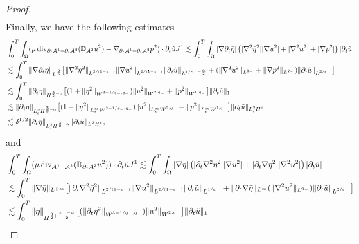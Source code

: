 \documentclass[letterpaper,reqno,10pt,twoside]{amsart}
\theoremstyle{definition}
\theoremstyle{remark}
\def\p{\partial}
\def\Om{\Omega}
\def\dive{\mathop{\rm div}\nolimits}
\begin{document}
\begin{proof}
\begin{align}
			\end{align}
			Finally, we have the following estimates
			\begin{equation}\label{est:remain_bulk23}
				\begin{aligned}
					&\int_0^T\int_\Om (\mu\dive_{\p_t\mathcal{A}^1-\p_{t}\mathcal{A}^{2}}(\mathbb{D}_{\mathcal{A}^2}{u}^{2})-\nabla_{\p_t\mathcal{A}^1-\p_{t}\mathcal{A}^{2}}{p}^{2})\cdot\p_t\tilde{u}J^1\lesssim\int_0^T\int_\Om |\nabla\p_t\bar{\eta}|\left(|\nabla^2\bar{\eta}^2||\nabla{u}^{2}|+|\nabla^2{u}^{2}|+|\nabla{p}^{2}|\right)|\p_t\tilde{u}|\\
					&\lesssim\int_0^T\|\nabla\p_t\bar{\eta}\|_{L^{\frac{2}{\alpha}}}\big[\|\nabla^2\bar{\eta}^2\|_{L^{2/(1-\varepsilon_-)}}\|\nabla{u}^{2}\|_{L^{2/(1-\varepsilon_-)}}\|\p_t\tilde{u}\|_{L^{1/\varepsilon_--\frac{\alpha}{2}}}+(\|\nabla^2{u}^{2}\|_{L^{q_-}}+\|\nabla{p}^{2}\|_{L^{q_-}})\|\p_t\tilde{u}\|_{L^{2/\varepsilon_-}}\big]\\
					&\lesssim\int_0^T\|\p_t\eta\|_{H^{\frac{3}{2}-\alpha}}\big[(1+\|\eta^2\|_{W^{3-1/q_-,q_-}})\|{u}^{2}\|_{W^{2,q_-}}+\|{p}^{2}\|_{W^{1,q_-}}\big]\|\p_t\tilde{u}\|_{1}\\
					&\lesssim \|\p_t\eta\|_{L_{t}^{2}H^{\frac{3}{2}-\alpha}}\big[(1+\|\eta^2\|_{L_{t}^{\infty}W^{3-1/q_-,q_-}})\|{u}^{2}\|_{L_{t}^{\infty}W^{2,q_-}}+\|{p}^{2}\|_{L_{t}^{\infty}W^{1,q_-}}\big]\|\p_t\tilde{u}\|_{L_{t}^{2}H^{1}}\\
					&\lesssim\delta^{1/2}\|\p_t\eta\|_{L_{t}^{2}H^{\frac{3}{2}-\alpha}}\|\p_t\tilde{u}\|_{L^2H^1},
				\end{aligned}
			\end{equation}
			and 
			\begin{equation}
				\begin{aligned}
					&\int_0^T\int_\Om (\mu\dive_{\mathcal{A}^1-\mathcal{A}^{2}}(\mathbb{D}_{\p_{t}\mathcal{A}^2}{u}^{2}))\cdot\p_t\tilde{u}J^1\lesssim\int_0^T\int_\Om |\nabla\bar{\eta}|\left(|\p_{t}\nabla^2\bar{\eta}^2||\nabla{u}^{2}|+|\p_{t}\nabla\bar{\eta}^{2}||\nabla^2{u}^{2}|\right)|\p_t\tilde{u}|\\
					&\lesssim\int_0^T\|\nabla\bar{\eta}\|_{L^{+\infty}}\big[\|\p_{t}\nabla^2\bar{\eta}^2\|_{L^{2/(1-\varepsilon_-)}}\|\nabla{u}^{2}\|_{L^{2/(1-\varepsilon_-)}}\|\p_t\tilde{u}\|_{L^{1/\varepsilon_-}}+\|\p_{t}\nabla\bar{\eta}\|_{L^{\infty}}(\|\nabla^2{u}^{2}\|_{L^{q_-}})\|\p_t\tilde{u}\|_{L^{2/\varepsilon_-}}\big]\\
					&\lesssim\int_0^T\|\eta\|_{H^{\frac{3}{2}+\frac{\varepsilon_{-}-\alpha}{2}}}\big[(\|\p_{t}\eta^2\|_{W^{3-1/q_-,q_-}})\|{u}^{2}\|_{W^{2,q_-}}\big]\|\p_t\tilde{u}\|_{1}\\

\end{aligned}
\end{equation}
\end{proof}
\end{document}
